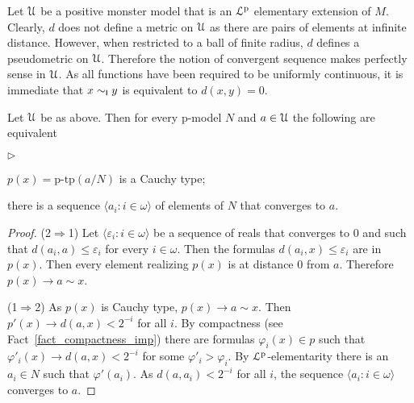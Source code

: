 \documentclass[10pt,oneside]{amsproc}
\newcommand{\mylabel}[1]{{#1}\hfill}
\renewenvironment{itemize}
  {\begin{list}{$\triangleright$}{%
  \setlength{\parskip}{0mm}
  \setlength{\topsep}{.4\baselineskip}
  \setlength{\rightmargin}{0mm}
  \setlength{\listparindent}{0mm}
  \setlength{\itemindent}{0mm}
  \setlength{\labelwidth}{3ex}
  \setlength{\itemsep}{.2\baselineskip}
  \setlength{\parsep}{.2\baselineskip}
  \setlength{\partopsep}{0mm}
  \setlength{\labelsep}{1ex}
  \setlength{\leftmargin}{\labelwidth+\labelsep}
  \let\makelabel\mylabel}}{%
\end{list}}
\begin{document}
{Let ${\EuScript U}$ be a positive monster model that is  an ${\EuScript L}^{\rm p}$ elementary extension of $M$.
Clearly, $d$ does not define a metric on ${\EuScript U}$ as there are pairs of elements at infinite distance.
However, when restricted to a ball of finite radius, $d$ defines a pseudometric on ${\EuScript U}$.
Therefore the notion of convergent sequence makes perfectly sense in ${\EuScript U}$.
As all functions have been required to be uniformly continuous, it is immediate that $x\sim_{\sf I}y$ is equivalent to $d(x,y)=0$.

\begin{fact}
  Let $ {\EuScript U}$ be as above.
  Then for every p-model $N$ and $a\in{\EuScript U}$ the following are equivalent
  \begin{itemize}
    \item[1.] $p(x)=\mbox{p-tp}(a/N)$ is a Cauchy type;
    \item[2.] there is a sequence $\langle a_i: i\in\omega\rangle$ of elements of $N$ that converges to $a$.
  \end{itemize} 
\end{fact}

\begin{proof}

  (2$\Rightarrow$1) 
  Let $\langle \varepsilon_i: i\in\omega\rangle$ be a sequence of reals that converges to $0$ and such that $d(a_i,a)\le\varepsilon_i$ for every $i\in\omega$.
  Then the formulas $d(a_i,x)\le\varepsilon_i$ are in $p(x)$.
  Then every element realizing $p(x)$ is at distance $0$ from $a$.
  Therefore  $p(x)\rightarrow a\sim x$.

  (1$\Rightarrow$2) 
  As $p(x)$ is Cauchy type, $p(x)\rightarrow a\sim x$.
  Then $p'(x)\rightarrow d(a,x)<2^{-i}$ for all $i$.
  By compactness (see Fact~\ref{fact_compactness_imp}) there are formulas $\varphi_i(x)\in p$ such that $\varphi'_i(x)\rightarrow d(a,x)<2^{-i}$ for some $\varphi'_i>\varphi_i$.
  By ${\EuScript L}^{\rm p}$-elementarity there is an $a_i\in N$ such that $\varphi'(a_i)$.
  As $d(a,a_i)<2^{-i}$ for all $i$, the sequence $\langle a_i: i\in\omega\rangle$ converges to $a$.
\end{proof}



}
\end{document}
